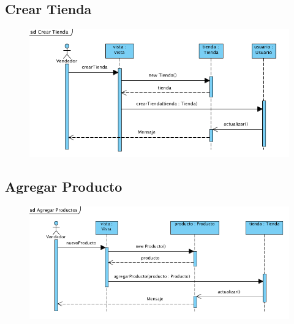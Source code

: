 \subsection{Crear Tienda}
\begin{figure}[H]
  \centering
    \includegraphics{imagenes/disenio/secuencia-crear-tienda.png}
    \label{fig:diagrama-secuencia-crear-tienda}
\end{figure}

\subsection{Agregar Producto}
\begin{figure}[H]
  \centering
    \includegraphics[width=1\textwidth]{imagenes/disenio/secuencia-agregar-producto.png}
    \label{fig:diagrama-secuencia-agregar-producto}
\end{figure}

